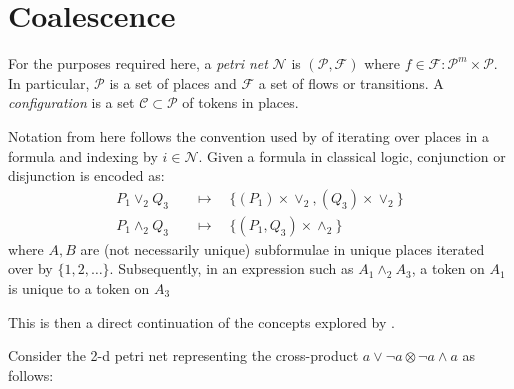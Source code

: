 \section{Coalescence}
    
    \begin{definition*}
        For the purposes required here, a \textit{petri net} $\mathcal{N}$ is $(\mathcal{P, F})$ where $f \in \mathcal{F} : \mathcal{P}^m \times \mathcal{P}$.
        In particular, $\mathcal{P}$ is a set of places and $\mathcal{F}$ a set of flows or transitions.
        A \textit{configuration} is a set $\mathcal{C} \subset \mathcal{P}$ of tokens in places.

        Notation from here follows the convention used by \citet{naming-proofs-in-cl} of iterating over places in a formula and indexing by $i \in \mathcal{N}$.
        Given a formula in classical logic, conjunction or disjunction is encoded as:
        \begin{align*}
            P_1 \vee_2 Q_3    &\quad\mapsto\quad \{ (P_1) \times \vee_2, (Q_3) \times \vee_2 \} \\
            P_1 \wedge_2 Q_3 &\quad\mapsto\quad \{ (P_1, Q_3) \times \wedge_2 \}
        \end{align*}
        where $A, B$ are (not necessarily unique) subformulae in unique places iterated over by $\{1, 2, \ldots\}$.
        Subsequently, in an expression such as $A_1 \wedge_2 A_3$, a token on $A_1$ is unique to a token on $A_3$

        This is then a direct continuation of the concepts explored by \citet{petri-nets}.
    \end{definition*}

    \begin{example*}
        Consider the 2-d petri net representing the cross-product $a \vee \neg a \otimes \neg a \wedge a$ as follows:
        
    \end{example*}


